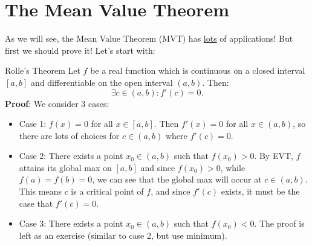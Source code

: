 \chapter{The Mean Value Theorem}
As we will see, the Mean Value Theorem (MVT) has \underline{lots} of applications! But first we should prove it! Let's start with:
\begin{Theorem}{Rolle's Theorem}{}
    Let $ f $ be a real function which is continuous on a closed interval
    $ [a,b] $ and differentiable on the open interval $ (a,b) $.\smallskip
    Then:
    \[ \exists c\in(a,b):f'(c)=0. \]
    \tcblower{}
    \textbf{Proof}: We consider 3 cases:
    \begin{itemize}
        \item Case 1: $ f(x)=0 $ for all $ x\in[a,b] $. Then $ f'(x)=0 $ for all $ x\in(a,b) $,
              so there are lots of choices for $ c\in(a,b) $ where $ f'(c)=0 $.
        \item Case 2: There exists a point $ x_0\in(a,b) $ such that $ f(x_0)>0 $. By EVT, $ f $
              attains its global max on $ [a,b] $ and since $ f(x_0)>0 $, while $ f(a)=f(b)=0 $,
              we can see that the global max will occur at $ c\in(a,b) $. This means $ c $
              is a critical point of $ f $, and since $ f'(c) $ exists, it must be the case that $ f'(c)=0 $.
        \item Case 3: There exists a point $ x_0\in(a,b) $ such that $ f(x_0)<0 $. The proof is left
              as an exercise (similar to case 2, but use minimum).
    \end{itemize}
\end{Theorem}

